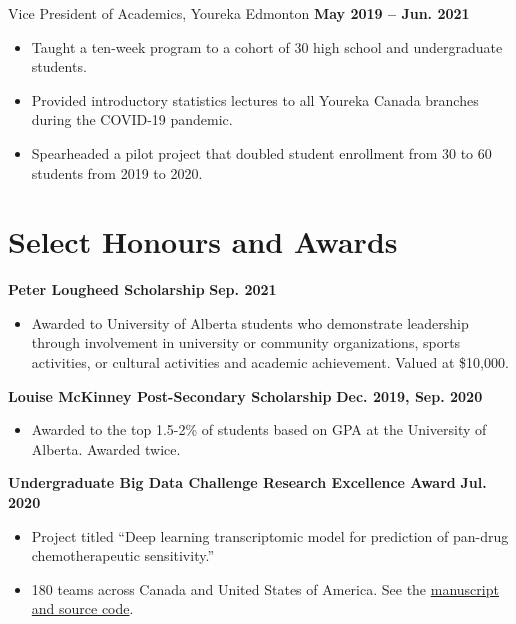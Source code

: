 \documentclass{article}
\begin{document}
Vice President of Academics, Youreka Edmonton \hfill \textbf{May 2019 -- Jun. 2021}
\begin{itemize}
    \item Taught a ten-week program to a cohort of 30 high school and undergraduate students.
    \item Provided introductory statistics lectures to all Youreka Canada branches during the COVID-19 pandemic.
    \item Spearheaded a pilot project that doubled student enrollment from 30 to 60 students from 2019 to 2020.
\end{itemize}


\section*{\textcolor{my_colour}{Select Honours and Awards}}
\vspace{-.25em} \hrulefill \vspace{.75em}

\textbf{Peter Lougheed Scholarship} \hfill \textbf{Sep. 2021}
\begin{itemize}
    \item Awarded to University of Alberta students who demonstrate leadership through involvement in university or community organizations, sports activities, or cultural activities and academic achievement. Valued at \$10,000.
\end{itemize}

\textbf{Louise McKinney Post-Secondary Scholarship} \hfill \textbf{Dec. 2019, Sep. 2020}
\begin{itemize}
    \item Awarded to the top 1.5-2\% of students based on GPA at the University of Alberta. Awarded twice.
\end{itemize}

\textbf{Undergraduate Big Data Challenge Research Excellence Award} \hfill \textbf{Jul. 2020}
\begin{itemize}
    \item Project titled ``Deep learning transcriptomic model for prediction of pan-drug chemotherapeutic sensitivity.''
    \item 180 teams across Canada and United States of America. See the \href{https://github.com/tig3r66/youreka_genes}{manuscript and source code}.
\end{itemize}
\end{document}
